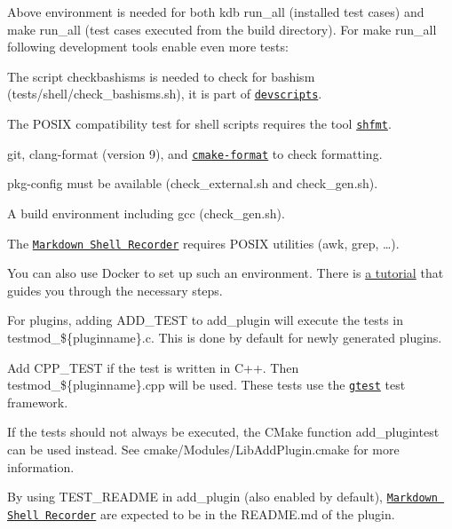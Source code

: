 Above environment is needed for both {\ttfamily kdb run\+\_\+all} (installed test cases) and {\ttfamily make run\+\_\+all} (test cases executed from the build directory). For {\ttfamily make run\+\_\+all} following development tools enable even more tests\+:


\begin{DoxyItemize}
\item The script {\ttfamily checkbashisms} is needed to check for bashism ({\ttfamily tests/shell/check\+\_\+bashisms.\+sh}), it is part of \href{https://packages.debian.org/devscripts}{\tt {\ttfamily devscripts}}.
\item The P\+O\+S\+IX compatibility test for shell scripts requires the tool \href{https://github.com/mvdan/sh}{\tt {\ttfamily shfmt}}.
\item {\ttfamily git}, {\ttfamily clang-\/format} (version 9), and \href{https://github.com/cheshirekow/cmake_format}{\tt cmake-\/format} to check formatting.
\item {\ttfamily pkg-\/config} must be available ({\ttfamily check\+\_\+external.\+sh} and {\ttfamily check\+\_\+gen.\+sh}).
\item A build environment including gcc ({\ttfamily check\+\_\+gen.\+sh}).
\item The \href{https://master.libelektra.org/tests/shell/shell_recorder/tutorial_wrapper}{\tt Markdown Shell Recorder} requires P\+O\+S\+IX utilities ({\ttfamily awk}, {\ttfamily grep}, …).
\end{DoxyItemize}

You can also use Docker to set up such an environment. There is \hyperlink{doc_tutorials_run_all_tests_with_docker_md}{a tutorial} that guides you through the necessary steps.

For plugins, adding {\ttfamily A\+D\+D\+\_\+\+T\+E\+ST} to {\ttfamily add\+\_\+plugin} will execute the tests in {\ttfamily testmod\+\_\+\$\{pluginname\}.c}. This is done by default for newly generated plugins.

Add {\ttfamily C\+P\+P\+\_\+\+T\+E\+ST} if the test is written in C++. Then {\ttfamily testmod\+\_\+\$\{pluginname\}.cpp} will be used. These tests use the \href{https://github.com/google/googletest}{\tt gtest} test framework.

If the tests should not always be executed, the C\+Make function {\ttfamily add\+\_\+plugintest} can be used instead. See cmake/\+Modules/\+Lib\+Add\+Plugin.\+cmake for more information.

By using {\ttfamily T\+E\+S\+T\+\_\+\+R\+E\+A\+D\+ME} in {\ttfamily add\+\_\+plugin} (also enabled by default), \href{https://master.libelektra.org/tests/shell/shell_recorder/tutorial_wrapper}{\tt Markdown Shell Recorder} are expected to be in the R\+E\+A\+D\+M\+E.\+md of the plugin.


